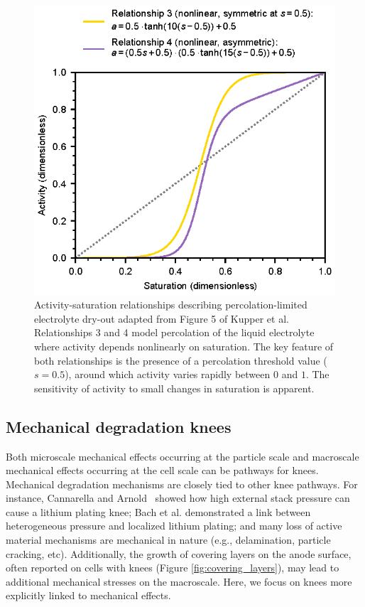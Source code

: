 \documentclass[journal=jpclcd,manuscript=article]{achemso}
\begin{document}
\begin{figure}[ht]
    \centering
    \includegraphics[scale=1.0]{figures/percolation.eps}
    \caption{Activity-saturation relationships describing percolation-limited electrolyte dry-out adapted from Figure 5 of Kupper et al.\cite{kupper_end--life_2018} Relationships 3 and 4 model percolation of the liquid electrolyte where activity depends nonlinearly on saturation. The key feature of both relationships is the presence of a percolation threshold value ($s=0.5$), around which activity varies rapidly between $0$ and $1$.
    The sensitivity of activity to small changes in saturation is apparent.}
    \label{fig:percolation}
\end{figure}

\subsection{Mechanical degradation knees}

Both microscale mechanical effects occurring at the particle scale and macroscale mechanical effects occurring at the cell scale can be pathways for knees.
Mechanical degradation mechanisms are closely tied to other knee pathways. For instance, Cannarella and Arnold~\cite{cannarella_stress_2014} showed how high external stack pressure can cause a lithium plating knee; Bach et al.\cite{bach_nonlinear_2016} demonstrated a link between heterogeneous pressure and localized lithium plating; and many loss of active material mechanisms are mechanical in nature (e.g., delamination, particle cracking, etc).
Additionally, the growth of covering layers on the anode surface, often reported on cells with knees (Figure \ref{fig:covering_layers}), \cite{lewerenz_post-mortem_2017,willenberg_development_2020,stiaszny_electrochemical_2014} may lead to additional mechanical stresses on the macroscale.
Here, we focus on knees more explicitly linked to mechanical effects.
\end{document}
